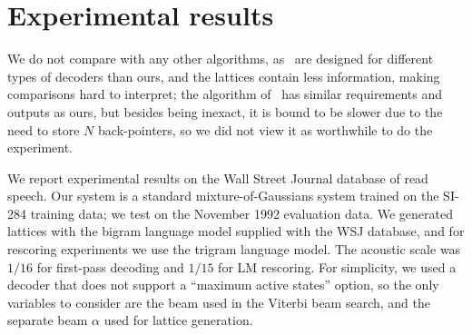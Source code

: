 \documentclass{article}
\begin{document}






\vspace*{-0.1in}
\section{Experimental results}
\vspace*{-0.075in}
\label{sec:exp}


We do not compare with any other algorithms,
as~\cite{ney_word_graph,odell_thesis,efficient_general} are designed for
different types of decoders than ours, and the lattices contain less information,
making comparisons hard to interpret; the algorithm of~\cite{saon2005anatomy} has
similar requirements and outputs as ours, but besides being inexact, it is bound
to be slower due to the need to store $N$ back-pointers, so we did not view it as
worthwhile to do the experiment.

We report experimental results on the Wall Street Journal database of
read speech. 
Our system is a standard mixture-of-Gaussians system trained on the SI-284
training data; we test on the November 1992 evaluation data.  
We generated lattices with the bigram language model
supplied with the WSJ database, and for rescoring experiments we
use the trigram language model.  The acoustic scale was $1/16$ for first-pass
decoding and $1/15$ for LM rescoring.  
For simplicity, we used a decoder that
does not support a ``maximum active states'' option, so the only variables
to consider are the beam used in the Viterbi beam search, and the separate
beam $\alpha$ used for lattice generation.
\end{document}

